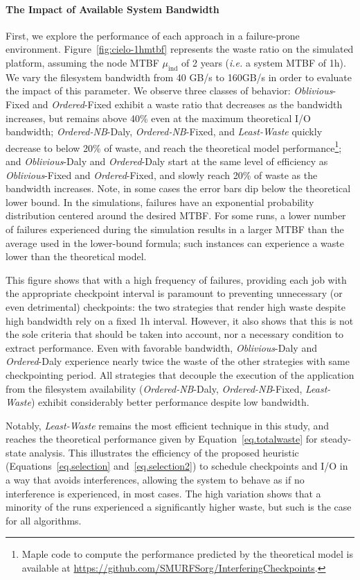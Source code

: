 \documentclass[conference,nofonttune]{IEEEtran}
\newcommand{\ie}[0]{\emph{i.e.}\xspace}
\newcommand{\muind}{\mu_{\text{ind}}}
\newcommand{\nocoop}{\emph{Oblivious}\xspace}
\newcommand{\fifoblock}{\emph{Ordered}\xspace}
\newcommand{\fifononblock}{\emph{Ordered-NB}\xspace}
\newcommand{\leastwaste}{\emph{Least-Waste}\xspace}
\def\propfixed{\nocoop-Fixed\xspace}
\def\propdaly{\nocoop-Daly\xspace}
\def\bfifofixed{\fifoblock-Fixed\xspace}
\def\bfifodaly{\fifoblock-Daly\xspace}
\def\fifofixed{\fifononblock-Fixed\xspace}
\def\fifodaly{\fifononblock-Daly\xspace}
\def\cooperative{\leastwaste}
\begin{document}
\paragraph{The Impact of Available System Bandwidth}
First, we explore the performance of each approach in a failure-prone
environment. Figure~\ref{fig:cielo-1hmtbf} represents the waste ratio
on the simulated platform, assuming the node MTBF $\muind$ of 2 years (\ie a system
MTBF of 1h). We vary the filesystem bandwidth from 40 GB/s to 160GB/s
in order to evaluate the impact of this parameter. We observe three
classes of behavior: \propfixed and \bfifofixed exhibit a waste ratio
that decreases as the bandwidth increases, but remains above 40\% even
at the maximum theoretical I/O bandwidth; \fifodaly, \fifofixed, and
\cooperative quickly decrease to below 20\% of waste, and reach
the theoretical model performance\footnote{Maple code to compute the
  performance predicted by the theoretical model is available at
  \url{https://github.com/SMURFSorg/InterferingCheckpoints}.};
%
and \propdaly and \bfifodaly start at the same level of efficiency as
\propfixed and \bfifofixed, and slowly reach 20\% of waste as the bandwidth
increases.
%
Note, in some cases the error bars dip below the theoretical
lower bound. In the simulations, failures have an exponential probability
distribution centered around the desired MTBF. For some runs, a lower
number of failures experienced during the simulation results in a larger
MTBF than the average used in the lower-bound formula; such instances
can experience a waste lower than the theoretical model.

This figure shows that with a high frequency of failures, providing each job
with the appropriate checkpoint interval is paramount to preventing unnecessary
(or even detrimental) checkpoints: the two strategies that render high waste
despite high bandwidth rely on a fixed 1h interval. However, it also shows that
this is not the sole criteria that should be taken into account, nor a
necessary condition to extract performance. Even with favorable bandwidth,
\propdaly and \bfifodaly experience nearly twice the waste of the other
strategies with same checkpointing period. All strategies that decouple the
execution of the application from the filesystem availability (\fifodaly,
\fifofixed, \cooperative) exhibit considerably better performance despite low
bandwidth.

Notably, \cooperative remains the most efficient technique in this study, and
reaches the theoretical performance given by Equation~\eqref{eq.totalwaste} for
steady-state analysis. This illustrates the efficiency of the proposed
heuristic (Equations~\eqref{eq.selection} and~\eqref{eq.selection2}) to
schedule checkpoints and I/O in a way that avoids interferences, allowing the
system to behave as if no interference is experienced, in most cases. The high
variation shows that a minority of the runs experienced a significantly higher
waste, but such is the case for all algorithms.
\end{document}
